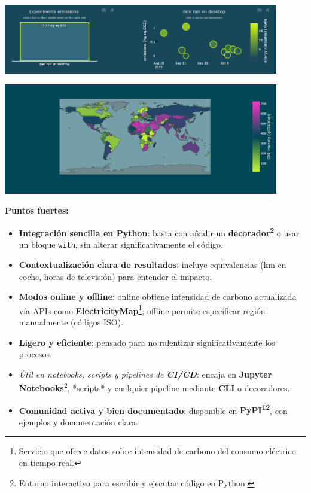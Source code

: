 \documentclass[12pt,a4paper]{report}
\begin{document}
\begin{center}
  \includegraphics[width=0.9\textwidth]{imagenes/CC_4.png}
\end{center}

\begin{center}
  \includegraphics[width=0.9\textwidth]{imagenes/CC_5.png}
\end{center}

\textbf{Puntos fuertes:}
\begin{itemize}
  \item \textbf{Integración sencilla en Python}: basta con añadir un \textbf{decorador\textsuperscript{2}} o usar un bloque \texttt{with}, sin alterar significativamente el código.
  \item \textbf{Contextualización clara de resultados}: incluye equivalencias (km en coche, horas de televisión) para entender el impacto.
  \item \textbf{Modos online y offline}: online obtiene intensidad de carbono actualizada vía APIs como \textbf{ElectricityMap}\footnote{Servicio que ofrece datos sobre intensidad de carbono del consumo eléctrico en tiempo real.}; offline permite especificar región manualmente (códigos ISO).
  \item \textbf{Ligero y eficiente}: pensado para no ralentizar significativamente los procesos.
  \item \textit{Útil en notebooks, scripts y pipelines de \textbf{CI/CD}}: encaja en \textbf{Jupyter Notebooks}\footnote{Entorno interactivo para escribir y ejecutar código en Python.}, *scripts* y cualquier pipeline mediante \textbf{CLI} o decoradores.
  \item \textbf{Comunidad activa y bien documentado}: disponible en \textbf{PyPI\textsuperscript{12}}, con ejemplos y documentación clara.
\end{itemize}
\end{document}
